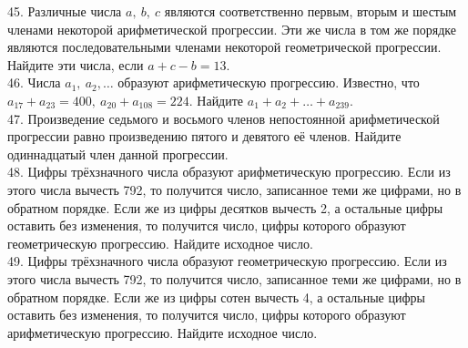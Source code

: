 45. Различные числа $a,\ b,\ c$ являются соответственно первым, вторым и шестым членами некоторой арифметической прогрессии. Эти же числа в том же порядке являются последовательными членами некоторой геометрической прогрессии. Найдите эти числа, если $a+c-b=13.$\\
46. Числа $a_1,\ a_2,\ldots$ образуют арифметическую прогрессию. Известно, что $a_{17}+a_{23}=400,\ a_{20}+a_{108}=224.$ Найдите $a_{1}+a_2+\ldots+a_{239}.$\\
47. Произведение седьмого и восьмого членов непостоянной арифметической прогрессии равно произведению пятого и девятого её членов. Найдите одиннадцатый член данной прогрессии.\\
48. Цифры трёхзначного числа образуют арифметическую прогрессию. Если из этого числа вычесть 792, то получится число, записанное теми же цифрами, но в обратном порядке. Если же из цифры десятков вычесть 2, а остальные цифры оставить без изменения, то получится число, цифры которого образуют геометрическую прогрессию. Найдите исходное число.\\
49. Цифры трёхзначного числа образуют геометрическую прогрессию. Если из этого числа вычесть 792, то получится число, записанное теми же цифрами, но в обратном порядке. Если же из цифры сотен вычесть 4, а остальные цифры оставить без изменения, то получится число, цифры которого образуют арифметическую прогрессию. Найдите исходное число.
\newpage
